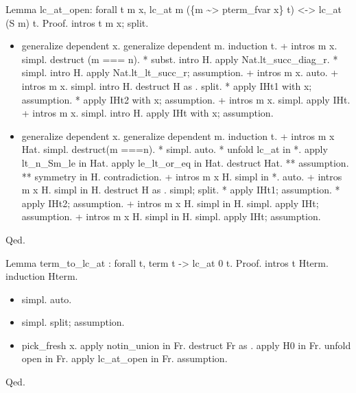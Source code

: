 Lemma lc\_at\_open: forall t m x, lc\_at m (\{m \~{}> pterm\_fvar x\} t) <-> lc\_at (S m) t.
Proof.
  intros t m x; split.

\begin{itemize}
\item  generalize dependent x.
    generalize dependent m.
    induction t.
    + intros m x.
      simpl.
      destruct (m === n).
      * subst.
        intro H.
        apply Nat.lt\_succ\_diag\_r.
      * simpl.
        intro H.
        apply Nat.lt\_lt\_succ\_r; assumption.
    + intros m x.
      auto.
    + intros m x.
      simpl.
      intro H.
      destruct H as  .
      split.
      * apply IHt1 with x; assumption.
      * apply IHt2 with x; assumption.
    + intros m x.
      simpl.
      apply IHt.
    + intros m x.
      simpl.
      intro H.
      apply IHt with x; assumption.

\item  generalize dependent x.
    generalize dependent m.
    induction t.
    + intros m x Hat.
      simpl.
      destruct(m ===n).
      * simpl.
        auto.
      * unfold lc\_at in *.
        apply lt\_n\_Sm\_le in Hat.
        apply le\_lt\_or\_eq in Hat.
        destruct Hat.
        ** assumption.
        ** symmetry in H.
          contradiction.
    + intros m x H.
      simpl in *.
      auto.
    + intros m x H.
      simpl in H.
      destruct H as  .
      simpl; split.
      * apply IHt1; assumption.
      * apply IHt2; assumption.
    + intros m x H.
      simpl in H.
      simpl.
      apply IHt; assumption.
    + intros m x H.
      simpl in H.
      simpl.
      apply IHt; assumption.

\end{itemize}
Qed.


Lemma term\_to\_lc\_at : forall t, term t -> lc\_at 0 t.
Proof.
  intros t Hterm.
  induction Hterm.

\begin{itemize}
\item  simpl.
    auto.

\item  simpl.
    split; assumption.

\item  pick\_fresh x.
    apply notin\_union in Fr.
    destruct Fr as  .
    apply H0 in Fr.
    unfold open in Fr.
    apply lc\_at\_open in Fr.
    assumption.

\end{itemize}
Qed.




